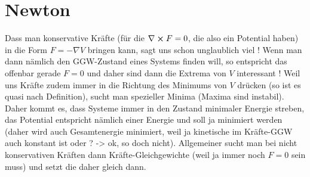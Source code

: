 \documentclass[../KlassMech_main.tex]{subfiles}
\begin{document}
\chapter{Newton}

Dass man konservative Kräfte (für die $\nabla \cross F = 0$, die also ein Potential haben) in die Form $F = - \nabla V$ bringen kann, sagt uns schon unglaublich viel ! Wenn man dann nämlich den GGW-Zustand eines Systems finden will, so entspricht das offenbar gerade $F = 0$ und daher sind dann die Extrema von $V$ interessant ! Weil uns Kräfte zudem immer in die Richtung des Minimums von $V$ drücken (so ist es quasi nach Definition), sucht man spezieller Minima (Maxima sind instabil). Daher kommt es, dass Systeme immer in den Zustand minimaler Energie streben, das Potential entspricht nämlich einer Energie und soll ja minimiert werden (daher wird auch Gesamtenergie minimiert, weil ja kinetische im Kräfte-GGW auch konstant ist oder ? -> ok, so doch nicht). Allgemeiner sucht man bei nicht konservativen Kräften dann Kräfte-Gleichgewichte (weil ja immer noch $F = 0$ sein muss) und setzt die daher gleich dann.
\end{document}
